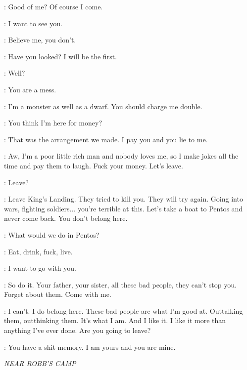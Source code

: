 \SHAE: Good of me? Of course I come. 


\SHAE: I want to see you. 

\TYRION: Believe me, you don't. 

\SHAE: Have you looked? I will be the first. 


\TYRION: Well? 

\SHAE:  You are a mess. 

\TYRION: I'm a monster as well as a dwarf. You should charge me double. 

\SHAE: You think I'm here for money? 

\TYRION: That was the arrangement we made. I pay you and you lie to me. 

\SHAE: Aw, I'm a poor little rich man and nobody loves me, so I make jokes all the time and pay them to laugh. Fuck your money. Let's leave. 

\TYRION: Leave? 

\SHAE: Leave King's Landing. They tried to kill you. They will try again. Going into wars, fighting soldiers$\ldots$ you're terrible at this. Let's take a boat to Pentos and never come back. You don't belong here. 

\TYRION: What would we do in Pentos? 

\SHAE: Eat, drink, fuck, live. 

\TYRION: I want to go with you. 

\SHAE: So do it.  Your father, your sister, all these bad people, they can't stop you. Forget about them. Come with me. 

\TYRION: I can't. I do belong here. These bad people are what I'm good at. Outtalking them, outthinking them. It's what I am. And I like it. I like it more than anything I've ever done. Are you going to leave? 

\SHAE: You have a shit memory. I am yours and you are mine. 



\scene

\textit{NEAR ROBB'S CAMP} 


